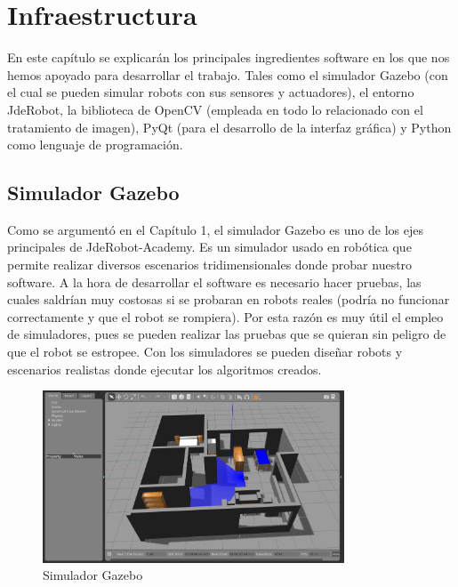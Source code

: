 \chapter{Infraestructura}\label{cap.infraestructura}
En este capítulo se explicarán los principales ingredientes software en los que nos hemos apoyado para desarrollar el trabajo. Tales como el simulador Gazebo (con el cual se pueden simular robots con sus sensores y actuadores), el entorno JdeRobot, la biblioteca de OpenCV (empleada en todo lo relacionado con el tratamiento de imagen), PyQt (para el desarrollo de la interfaz gráfica) y Python como lenguaje de programación.

\section{Simulador Gazebo}

Como se argumentó en el Capítulo 1, el simulador Gazebo es uno de los ejes principales de JdeRobot-Academy. Es un simulador usado en robótica que permite realizar diversos escenarios tridimensionales donde probar nuestro software. A la hora de desarrollar el software es necesario hacer pruebas, las cuales saldrían muy costosas si se probaran en robots reales (podría no funcionar correctamente y que el robot se rompiera). Por esta razón es muy útil el empleo de simuladores, pues se pueden realizar las pruebas que se quieran sin peligro de que el robot se estropee. Con los simuladores se pueden diseñar robots y escenarios realistas donde ejecutar los algoritmos creados.

\begin{figure}[H]
  \begin{center}
    \includegraphics[width=0.8\textwidth]{figures/Infraestructura/gazebo.png}
		\caption{Simulador Gazebo}
		\label{fig.gazebo}
		\end{center}
\end{figure}


